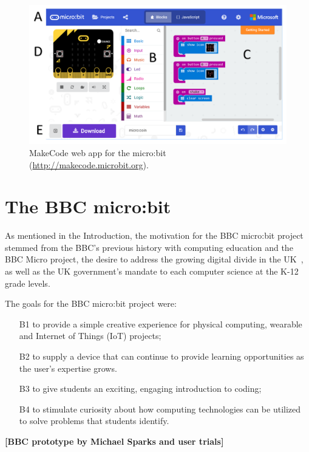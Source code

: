 \begin{figure}[t]
    \includegraphics[width=6in]{images/webApp.png}
    \caption{\label{fig:snapshot}MakeCode web app for the micro:bit (\url{http://makecode.microbit.org}).}
  \end{figure}

\section{The BBC micro:bit}


As mentioned in the Introduction, the motivation for the BBC micro:bit project
stemmed from the BBC's previous history with computing education and the BBC Micro
project, the desire to address the growing digital divide in the UK~\cite{XYZ}, 
as well as the UK government's mandate to each computer science at the K-12 grade levels. 

The goals for the BBC micro:bit project were:
\begin{itemize}
    \item[B1] to provide a simple creative experience for physical computing, wearable and Internet of Things (IoT) projects;
    \item[B2] to supply a device that can continue to provide learning opportunities as the user's expertise grows.
    \item[B3] to give students an exciting, engaging introduction to coding;
    \item[B4] to stimulate curiosity about how computing technologies can be utilized to solve problems that students identify.
\end{itemize}

{\bf [BBC prototype by Michael Sparks and user trials] }

